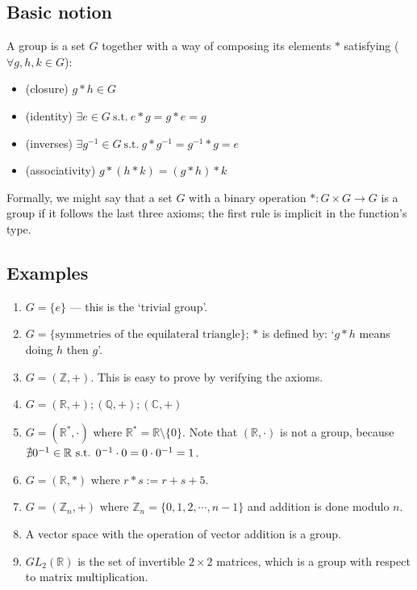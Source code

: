 \subsection{Basic notion}
\begin{definition}[Group]
	A group is a set \(G\) together with a way of composing its elements \(\ast\) satisfying (\(\forall g, h, k \in G\)):
	\begin{itemize}
		\item (closure) \(g \ast h \in G\)
		\item (identity) \(\exists e \in G \mathrm{\ s.t.\ } e \ast g = g \ast e = g\)
		\item (inverses) \(\exists g^{-1} \in G \mathrm{\ s.t.\ } g \ast g^{-1} = g^{-1} \ast g = e\)
		\item (associativity) \(g \ast (h \ast k) = (g \ast h) \ast k\)
	\end{itemize}
\end{definition}

Formally, we might say that a set \(G\) with a binary operation \(\ast : G \times G \to G\) is a group if it follows the last three axioms; the first rule is implicit in the function's type.

\subsection{Examples}
\begin{enumerate}
	\item \(G = \{ e \}\) --- this is the `trivial group'.
	\item \(G = \{ \text{symmetries of the equilateral triangle} \} \); \(\ast\) is defined by: `\(g \ast h\) means doing \(h\) then \(g\)'.
	\item \(G = (\mathbb Z, +)\).
	      This is easy to prove by verifying the axioms.
	\item \(G = (\mathbb R, +); (\mathbb Q, +); (\mathbb C, +)\)
	\item \(G = (\mathbb R^*, \cdot)\) where \(\mathbb R^* = \mathbb R \setminus \{ 0\}\).
	      Note that \((\mathbb R, \cdot)\) is not a group, because \(\nexists 0^{-1} \in \mathbb R \text{ s.t. } 0^{-1} \cdot 0 = 0 \cdot 0^{-1} = 1\).
	\item \(G = (\mathbb R, \ast)\) where \(r \ast s := r + s + 5\).
	\item \(G = (\mathbb Z_n, +)\) where \(\mathbb Z_n = \{ 0, 1, 2, \cdots, n-1 \}\) and addition is done modulo \(n\).
	\item A vector space with the operation of vector addition is a group.
	\item \(GL_2(\mathbb R)\) is the set of invertible \(2\times 2\) matrices, which is a group with respect to matrix multiplication.
\end{enumerate}

